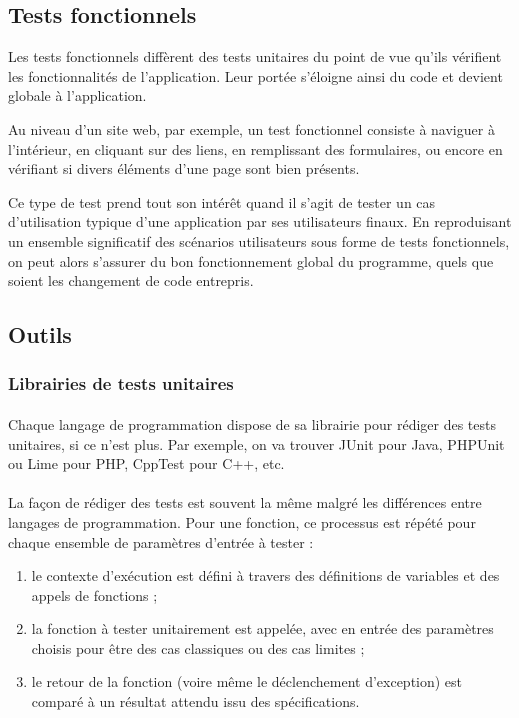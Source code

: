 \subsection{Tests fonctionnels}

Les tests fonctionnels diffèrent des tests unitaires du point de vue qu'ils vérifient les fonctionnalités de l'application.
Leur portée s'éloigne ainsi du code et devient globale à l'application.

Au niveau d'un site web, par exemple, un test fonctionnel consiste à naviguer à l'intérieur, en cliquant sur des liens, en remplissant des formulaires, ou encore en vérifiant si divers éléments d'une page sont bien présents.

Ce type de test prend tout son intérêt quand il s'agit de tester un cas d'utilisation typique d'une application par ses utilisateurs finaux.
En reproduisant un ensemble significatif des scénarios utilisateurs sous forme de tests fonctionnels, on peut alors s'assurer du bon fonctionnement global du programme, quels que soient les changement de code entrepris.



\subsection{Outils}

\subsubsection{Librairies de tests unitaires}

\paragraph{}
Chaque langage de programmation dispose de sa librairie pour rédiger des tests unitaires, si ce n'est plus.
Par exemple, on va trouver JUnit pour Java, PHPUnit ou Lime pour PHP, CppTest pour C++, etc.

\paragraph{}
La façon de rédiger des tests est souvent la même malgré les différences entre langages de programmation.
Pour une fonction, ce processus est répété pour chaque ensemble de paramètres d'entrée à tester :

\begin{enumerate}
	\item le contexte d'exécution est défini à travers des définitions de variables et des appels de fonctions ;
	\item la fonction à tester unitairement est appelée, avec en entrée des paramètres choisis pour être des cas classiques ou des cas limites ;
	\item le retour de la fonction (voire même le déclenchement d'exception) est comparé à un résultat attendu issu des spécifications.
\end{enumerate}

